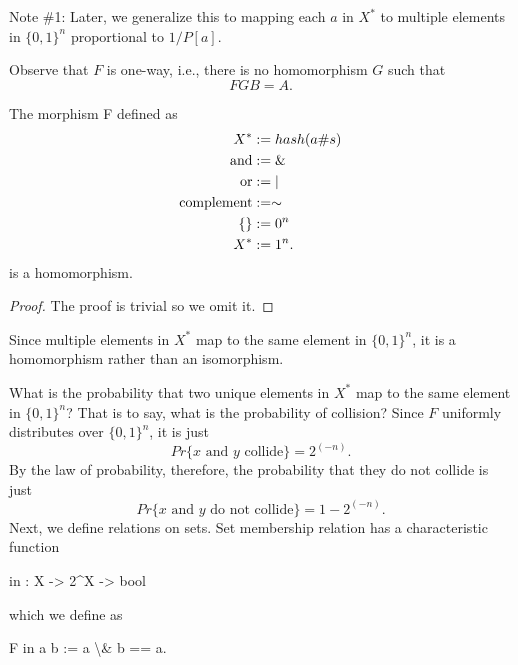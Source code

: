 \documentclass[
]{article}
\newenvironment{Shaded}{\begin{snugshade}}{\end{snugshade}}
\newcommand{\DataTypeTok}[1]{\textcolor[rgb]{0.13,0.29,0.53}{#1}}
\newcommand{\DecValTok}[1]{\textcolor[rgb]{0.00,0.00,0.81}{#1}}
\newcommand{\NormalTok}[1]{#1}
\begin{document}
Note \#1: Later, we generalize this to mapping each \(a\) in \(X^*\) to
multiple elements in \(\{0,1\}^n\) proportional to \(1/P[a]\).

Observe that \(F\) is one-way, i.e., there is no homomorphism \(G\) such
that \[
    F G B = A.
\]

\begin{theorem}
The morphism F defined as
\begin{align*}
    X^*        &:= hash(a \# s)\\
    \rm{and}        &:= \&\\
    \rm{or}         &:= |\\
    \rm{complement} &:= \sim\\
    \{\}       &:= 0^n\\
    X^*        &:= 1^n.
\end{align*}
is a homomorphism.
\end{theorem}

\begin{proof}
The proof is trivial so we omit it.
\end{proof}

Since multiple elements in \(X^*\) map to the same element in
\(\{0,1\}^n\), it is a homomorphism rather than an isomorphism.

What is the probability that two unique elements in \(X^*\) map to the
same element in \(\{0,1\}^n\)? That is to say, what is the probability
of collision? Since \(F\) uniformly distributes over \(\{0,1\}^n\), it
is just \[
    Pr\{\text{$x$ and $y$ collide}\} = 2^(-n).
\] By the law of probability, therefore, the probability that they do
not collide is just \[
    Pr\{\text{$x$ and $y$ do not collide}\} = 1 - 2^(-n).
\] Next, we define relations on sets. Set membership relation has a
characteristic function

\begin{Shaded}
\begin{Highlighting}[]
\NormalTok{   in : X {-}\textgreater{} }\DecValTok{2}\NormalTok{\^{}X {-}\textgreater{} }\DataTypeTok{bool}
\end{Highlighting}
\end{Shaded}

which we define as

\begin{Shaded}
\begin{Highlighting}[]
\NormalTok{   F in a b := a \textbackslash{}\& b == a.}
\end{Highlighting}
\end{Shaded}
\end{document}
